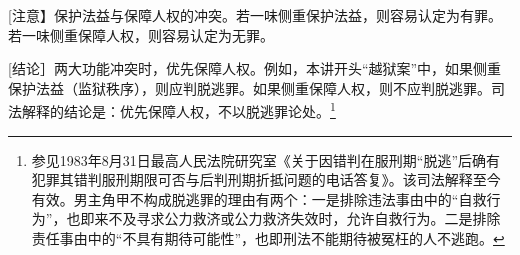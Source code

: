 [注意】保护法益与保障人权的冲突。若一味侧重保护法益，则容易认定为有罪。若一味侧重保障人权，则容易认定为无罪。

[结论］两大功能冲突时，优先保障人权。例如，本讲开头“越狱案”中，如果侧重保护法益（监狱秩序），则应判脱逃罪。如果侧重保障人权，则不应判脱逃罪。司法解释的结论是：优先保障人权，不以脱逃罪论处。\footnote{参见1983年8月31日最高人民法院研究室《关于因错判在服刑期“脱逃”后确有犯罪其错判服刑期限可否与后判刑期折抵问题的电话答复》。该司法解释至今有效。男主角甲不构成脱逃罪的理由有两个：一是排除违法事由中的“自救行为”，也即来不及寻求公力救济或公力救济失效时，允许自救行为。二是排除责任事由中的“不具有期待可能性”，也即刑法不能期待被冤枉的人不逃跑。}

